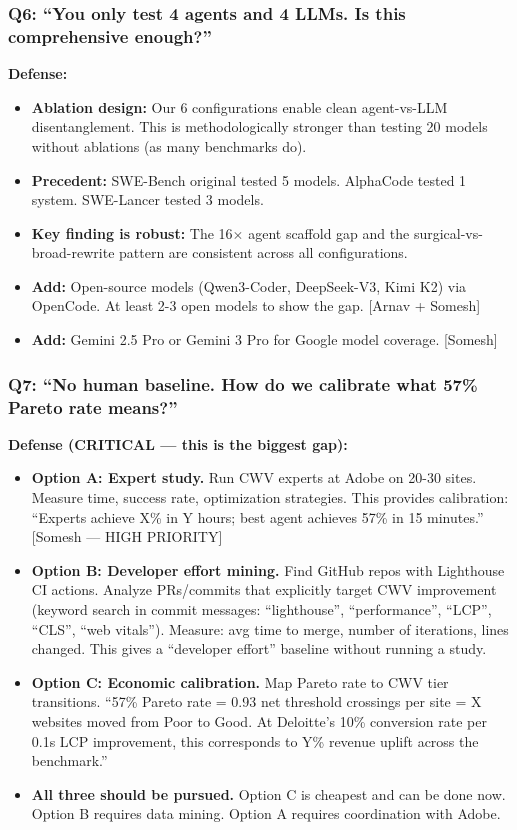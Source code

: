 \subsubsection{Q6: ``You only test 4 agents and 4 LLMs. Is this comprehensive enough?''}
\textbf{Defense:}
\begin{itemize}
    \item \textbf{Ablation design:} Our 6 configurations enable clean agent-vs-LLM disentanglement. This is methodologically stronger than testing 20 models without ablations (as many benchmarks do).
    \item \textbf{Precedent:} SWE-Bench original tested 5 models. AlphaCode tested 1 system. SWE-Lancer tested 3 models.
    \item \textbf{Key finding is robust:} The 16$\times$ agent scaffold gap and the surgical-vs-broad-rewrite pattern are consistent across all configurations.
    \item \textbf{Add:} Open-source models (Qwen3-Coder, DeepSeek-V3, Kimi K2) via OpenCode. At least 2-3 open models to show the gap. [Arnav + Somesh]
    \item \textbf{Add:} Gemini 2.5 Pro or Gemini 3 Pro for Google model coverage. [Somesh]
\end{itemize}

\subsubsection{Q7: ``No human baseline. How do we calibrate what 57\% Pareto rate means?''}
\textbf{Defense (CRITICAL --- this is the biggest gap):}
\begin{itemize}
    \item \textbf{Option A: Expert study.} Run CWV experts at Adobe on 20-30 sites. Measure time, success rate, optimization strategies. This provides calibration: ``Experts achieve X\% in Y hours; best agent achieves 57\% in 15 minutes.'' [Somesh --- HIGH PRIORITY]
    \item \textbf{Option B: Developer effort mining.} Find GitHub repos with Lighthouse CI actions. Analyze PRs/commits that explicitly target CWV improvement (keyword search in commit messages: ``lighthouse'', ``performance'', ``LCP'', ``CLS'', ``web vitals''). Measure: avg time to merge, number of iterations, lines changed. This gives a ``developer effort'' baseline without running a study.
    \item \textbf{Option C: Economic calibration.} Map Pareto rate to CWV tier transitions. ``57\% Pareto rate = 0.93 net threshold crossings per site = X websites moved from Poor to Good. At Deloitte's 10\% conversion rate per 0.1s LCP improvement, this corresponds to Y\% revenue uplift across the benchmark.''
    \item \textbf{All three should be pursued.} Option C is cheapest and can be done now. Option B requires data mining. Option A requires coordination with Adobe.
\end{itemize}


